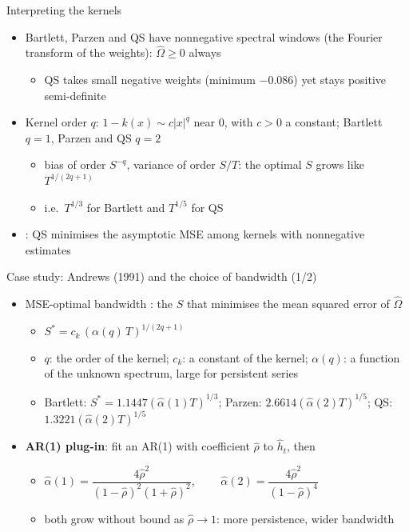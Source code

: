 \begin{frame}{Interpreting the kernels}
\itemsize{\small}
\begin{itemize}
    \item Bartlett, Parzen and QS have nonnegative spectral windows (the Fourier transform of the weights): $\hat\Omega \ge 0$ always
    \begin{itemize}
        \item QS takes small negative weights (minimum $\ensuremath{-}0.086$) yet stays positive semi-definite
    \end{itemize}
    \item Kernel order $q$: $1 - k(x) \sim c|x|^q$ near 0, with $c > 0$ a constant; Bartlett $q = 1$, Parzen and QS $q = 2$
    \begin{itemize}
        \item bias of order $S^{-q}$, variance of order $S/T$: the optimal $S$ grows like $T^{1/(2q+1)}$
        \item i.e.\ $T^{1/3}$ for Bartlett and $T^{1/5}$ for QS
    \end{itemize}
    \item {}: QS minimises the asymptotic MSE among kernels with nonnegative estimates
\end{itemize}
\end{frame}

\begin{frame}{Case study: Andrews (1991) and the choice of bandwidth (1/2)}
\itemsize{\small}
\begin{itemize}
    \item MSE-optimal bandwidth : the $S$ that minimises the mean squared error of $\hat\Omega$
    \begin{itemize}
        \item $S^* = c_k\,(\alpha(q)\,T)^{1/(2q+1)}$
        \item $q$: the order of the kernel; $c_k$: a constant of the kernel; $\alpha(q)$: a function of the unknown spectrum, large for persistent series
        \item Bartlett: $S^* = 1.1447(\hat\alpha(1)T)^{1/3}$; Parzen: $2.6614(\hat\alpha(2)T)^{1/5}$; QS: $1.3221(\hat\alpha(2)T)^{1/5}$
    \end{itemize}
    \item \textbf{AR(1) plug-in}: fit an AR(1) with coefficient $\hat\rho$ to $\hat h_t$, then
    \begin{itemize}
        \item $\hat\alpha(1) = \dfrac{4\hat\rho^2}{(1-\hat\rho)^2(1+\hat\rho)^2}$, $\qquad \hat\alpha(2) = \dfrac{4\hat\rho^2}{(1-\hat\rho)^4}$
        \item both grow without bound as $\hat\rho \to 1$: more persistence, wider bandwidth
    \end{itemize}
\end{itemize}
\end{frame}

